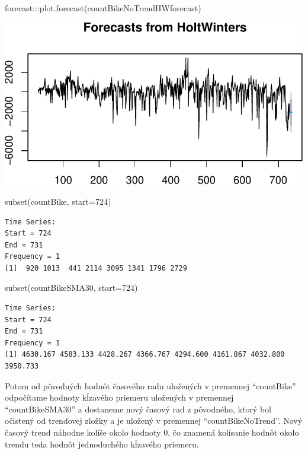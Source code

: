\documentclass[
  letterpaper,
  DIV=11,
  numbers=noendperiod]{scrreprt}
\newenvironment{Shaded}{\begin{snugshade}}{\end{snugshade}}
\newcommand{\AttributeTok}[1]{\textcolor[rgb]{0.40,0.45,0.13}{#1}}
\newcommand{\DecValTok}[1]{\textcolor[rgb]{0.68,0.00,0.00}{#1}}
\newcommand{\FunctionTok}[1]{\textcolor[rgb]{0.28,0.35,0.67}{#1}}
\newcommand{\NormalTok}[1]{\textcolor[rgb]{0.00,0.23,0.31}{#1}}
\newcommand{\SpecialCharTok}[1]{\textcolor[rgb]{0.37,0.37,0.37}{#1}}
\begin{document}
\begin{Shaded}
\begin{Highlighting}[]
\NormalTok{forecast}\SpecialCharTok{:::}\FunctionTok{plot.forecast}\NormalTok{(countBikeNoTrendHWforecast)}
\end{Highlighting}
\end{Shaded}

\includegraphics{prednaska2_HoltWinters_files/figure-pdf/unnamed-chunk-10-2.pdf}

\begin{Shaded}
\begin{Highlighting}[]
\FunctionTok{subset}\NormalTok{(countBike, }\AttributeTok{start=}\DecValTok{724}\NormalTok{)}
\end{Highlighting}
\end{Shaded}

\begin{verbatim}
Time Series:
Start = 724 
End = 731 
Frequency = 1 
[1]  920 1013  441 2114 3095 1341 1796 2729
\end{verbatim}

\begin{Shaded}
\begin{Highlighting}[]
\FunctionTok{subset}\NormalTok{(countBikeSMA30, }\AttributeTok{start=}\DecValTok{724}\NormalTok{)}
\end{Highlighting}
\end{Shaded}

\begin{verbatim}
Time Series:
Start = 724 
End = 731 
Frequency = 1 
[1] 4630.167 4583.133 4428.267 4366.767 4294.600 4161.867 4032.800 3950.733
\end{verbatim}

Potom od pôvodných hodnôt časového radu uložených v premennej
``countBike'' odpočítame hodnoty kĺzavého priemeru uložených v premennej
``countBikeSMA30'' a dostaneme nový časový rad z pôvodného, ktorý bol
očistený od trendovej zložky a je uložený v premennej
``countBikeNoTrend''. Nový časový trend náhodne kolíše okolo hodnoty 0,
čo znamená kolísanie hodnôt okolo trendu teda hodnôt jednoduchého
kĺzavého priemeru.
\end{document}
